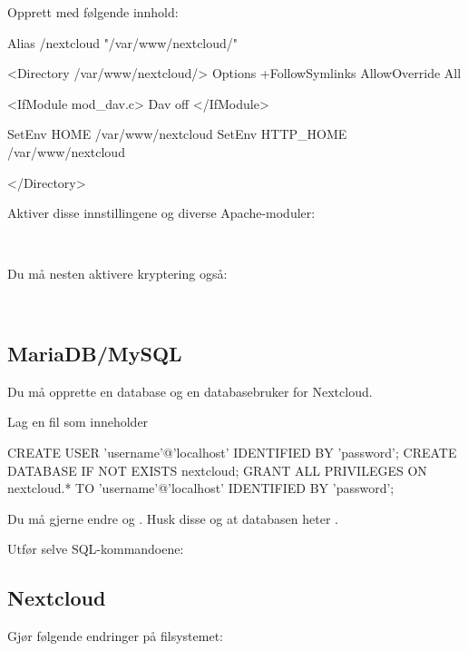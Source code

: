 Opprett  med følgende innhold:

\begin{filedata}
Alias /nextcloud "/var/www/nextcloud/"

<Directory /var/www/nextcloud/>
  Options +FollowSymlinks
  AllowOverride All

 <IfModule mod_dav.c>
  Dav off
 </IfModule>

 SetEnv HOME /var/www/nextcloud
 SetEnv HTTP_HOME /var/www/nextcloud

</Directory>
\end{filedata}

Aktiver disse innstillingene og diverse Apache-moduler:

\\

Du må nesten aktivere kryptering også:

\\

\subsection{MariaDB/MySQL}

Du må opprette en database og en databasebruker for Nextcloud.

Lag en fil  som inneholder

\begin{filedata}
CREATE USER 'username'@'localhost' IDENTIFIED BY 'password';
CREATE DATABASE IF NOT EXISTS nextcloud;
GRANT ALL PRIVILEGES ON nextcloud.* TO 
  'username'@'localhost' IDENTIFIED BY 'password';
\end{filedata}

Du må gjerne endre  og . 
Husk disse og at databasen heter .

Utfør selve SQL-kommandoene:


\subsection{Nextcloud}

Gjør følgende endringer på filsystemet:

\\
\\

